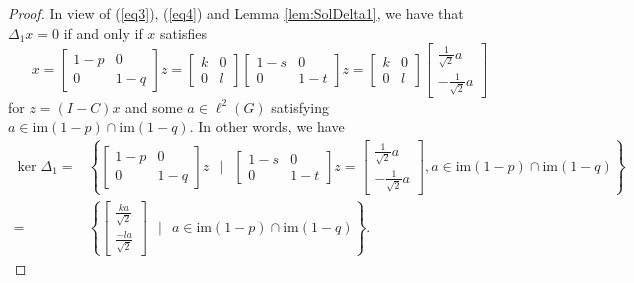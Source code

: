 \documentclass[10pt,a4paper]{amsart}
\begin{document}
	\begin{proof}
		In view of (\ref{eq3}), (\ref{eq4}) and Lemma \ref{lem:SolDelta1}, we have that $\Delta_1 x=0$ if and only if $x$ satisfies  
		\[
			x
			=
			\begin{bmatrix}1-p & 0 \\ 0 & 1-q\end{bmatrix}z
			= 
			\begin{bmatrix}k & 0 \\ 0 & l\end{bmatrix}
			\begin{bmatrix}1-s & 0 \\ 0 & 1-t \end{bmatrix}
			z
			=
			\begin{bmatrix}k & 0 \\ 0 & l\end{bmatrix}
			\begin{bmatrix}\frac{1}{\sqrt 2}a \\-\frac{1}{\sqrt 2}a
			\end{bmatrix} 
		\]
		for $z=(I-C)x$ and some $a\in \ell^2(G)$ satisfying $a\in\mathrm{im}(1-p)\cap\mathrm{im}(1-q)$.
		In other words, we have
		\begin{align*}
			\ker\Delta_1
			=
			&
			\left\{ 	
				\begin{bmatrix}1-p & 0 \\ 0 & 1-q\end{bmatrix}z
				~~\mid~~  
				\begin{bmatrix}1-s & 0 
				\\ 
				0 & 1-t\end{bmatrix}z=\begin{bmatrix}\frac{1}{\sqrt 2}a \\-\frac{1}{\sqrt 2}a
			\end{bmatrix}, a\in\mathrm{im}(1-p)\cap\mathrm{im}(1-q)  	
		   \right\}
		   \\
			=
			&
			  \left\{ 
			  	\begin{bmatrix}\frac{ka}{\sqrt 2} \\ \frac{-la}{\sqrt 2}\end{bmatrix}
			 	 ~~\mid~~ 
			  	a\in\mathrm{im}(1-p)\cap\mathrm{im}(1-q)  
			  \right\}.
		\end{align*}

\end{proof}
\end{document}

